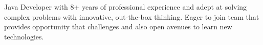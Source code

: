 
\par{
Java Developer with 8+ years of professional experience and adept at solving complex problems with innovative, out-the-box thinking. Eager to join team that provides  opportunity that challenges and also open avenues to learn new technologies.
 
}